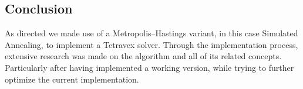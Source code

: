 \documentclass[11pt]{article}
\begin{document}
\begin{multicols*}{2}
\section{Conclusion}
As directed we made use of a Metropolis–Hastings variant, in this case Simulated
Annealing, to implement a Tetravex solver. Through the implementation process,
extensive research was made on the algorithm and all of its related concepts.
Particularly after having implemented a working version, while trying to further
optimize the current implementation.
\end{multicols*}
\end{document}
